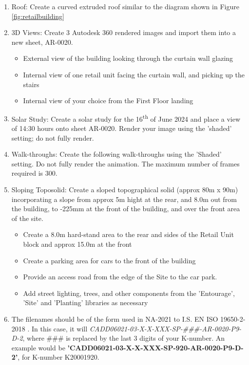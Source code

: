 \begin{enumerate}
	\item Roof: Create a curved extruded roof similar to the diagram shown in Figure \ref{fig:retailbuilding}
	
	\item 3D Views: Create 3 Autodesk 360 rendered images and import them into a new sheet, AR-0020.
	\begin{itemize}
		\item External view of the building looking through the curtain wall glazing
		\item Internal view of one retail unit facing the curtain wall, and picking up the stairs
		\item Internal view of your choice from the First Floor landing 
	\end{itemize} 
	\item Solar Study: Create a solar study for the 16\textsuperscript{th} of June 2024 and place a view of 14:30 hours onto sheet AR-0020.  Render your image using the 'shaded' setting; do not fully render.  
	\item Walk-throughs: Create the following walk-throughs using the 'Shaded' setting.  Do not fully render the animation.  The maximum number of frames required is 300.
	\item Sloping Toposolid: Create a sloped topographical solid (approx 80m x 90m) incorporating a slope from approx 5m hight at the rear, and 8.0m out from the building, to -225mm at the front of the building, and over the front area of the site.
	\begin{itemize}
		\item Create a 8.0m hard-stand area to the rear and sides of the Retail Unit block and approx 15.0m at the front
		\item Create a parking area for cars to the front of the building
		\item Provide an access road from the edge of the Site to the car park.
		\item Add street lighting, trees, and other components from the 'Entourage', 'Site' and 'Planting' libraries as necessary 
	\end{itemize}
	\item The filenames should be of the form used in NA-2021 to I.S. EN ISO 19650-2-2018
.  In this case, it will \textit{CADD06021-03-X-X-XXX-SP-\#\#\#-AR-0020-P9-D-2}, where \#\#\# is replaced by the last 3 digits of your K-number. An example would be \textbf{'CADD06021-03-X-X-XXX-SP-920-AR-0020-P9-D-2'}, for K-number K20001920.
\end{enumerate}

